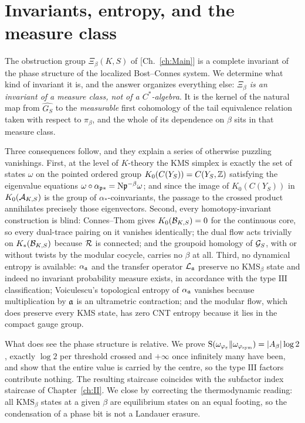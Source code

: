 \chapter[Invariants, entropy, and the measure class]{Invariants, entropy, and the measure class}\label{ch:III}
\renewcommand{\hO}{\widehat{\mathcal{O}}}
\begin{summary}
The obstruction group $\Xi_\beta(K,S)$ of [Ch.~\ref{ch:Main}] is a complete invariant of the phase
structure of the localized Bost--Connes system. We determine what kind of invariant it is,
and the answer organizes everything else: \emph{$\Xi_\beta$ is an invariant of a measure
class, not of a $C^*$-algebra}. It is the kernel of the natural map from $\widehat{G_S}$ to
the \emph{measurable} first cohomology of the tail equivalence relation taken with respect
to $\pi_\beta$, and the whole of its dependence on $\beta$ sits in that measure class.

Three consequences follow, and they explain a series of otherwise puzzling vanishings.
First, at the level of $K$-theory the KMS simplex is exactly the set of states $\omega$ on
the pointed ordered group $K_0(C(Y_S))=C(Y_S,\mathbb{Z})$ satisfying the eigenvalue equations
$\omega\circ\alpha_{\mathfrak{p}*}=\mathrm{N}\mathfrak{p}^{-\beta}\omega$; and since the image of
$K_0(C(Y_S))$ in $K_0(\mathcal{A}_{K,S})$ is the group of $\alpha_*$-coinvariants, the passage to
the crossed product annihilates precisely those eigenvectors. Second, every homotopy-invariant construction is blind:
Connes--Thom gives $K_0(\mathcal{B}_{K,S})=0$ for the continuous core, so every dual-trace pairing
on it vanishes identically; the dual flow acts trivially on $K_*(\mathcal{B}_{K,S})$ because $\mathcal{R}$ is
connected; and the groupoid homology of $\mathcal{G}_S$, with or without twists by the modular
cocycle, carries no $\beta$ at all. Third, no dynamical entropy is available:
$\alpha_{\mathfrak{a}}$ and the transfer operator $\mathcal{L}_{\mathfrak{a}}$ preserve no $\mathrm{KMS}_\beta$ state
and indeed no invariant probability measure exists, in accordance with the type
$\mathrm{III}$ classification; Voiculescu's topological entropy of $\alpha_{\mathfrak{a}}$ vanishes
because multiplication by $\mathfrak{a}$ is an ultrametric contraction; and the modular flow, which
does preserve every KMS state, has zero CNT entropy because it lies in the compact gauge
group.

What does see the phase structure is relative. We prove
$\mathrm{S}(\omega_{\varphi_\varepsilon}\|\omega_{\varphi_{\mathrm{sym}}})=|A_\beta|\log2$, exactly $\log2$ per
threshold crossed and $+\infty$ once infinitely many have been, and show that the entire
value is carried by the centre, so the type $\mathrm{III}$ factors contribute nothing. The
resulting staircase coincides with the subfactor index staircase of Chapter~\ref{ch:II}.
We close by correcting the thermodynamic reading: all $\mathrm{KMS}_\beta$ states at a given
$\beta$ are equilibrium states on an equal footing, so the condensation of a phase bit is
not a Landauer erasure.


\end{summary}
